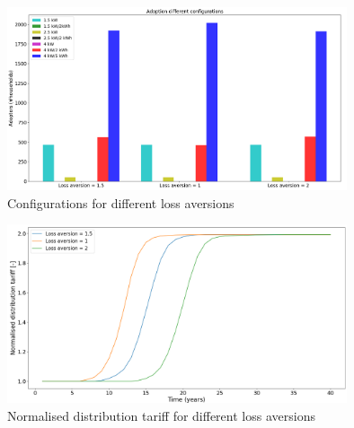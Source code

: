 \begin{figure}[h!]
    \centering
    \includegraphics[width=10cm]{AppendixA/ConfigSubsloss.PNG}
    \caption{Configurations for different loss aversions}
    \label{fig:C}
\end{figure}
\begin{figure}[h!]
    \centering
    \includegraphics[width=10cm]{AppendixA/DistSubsloss.PNG}
    \caption{Normalised distribution tariff for different loss aversions}
    \label{fig:D}
\end{figure}
\newpage

